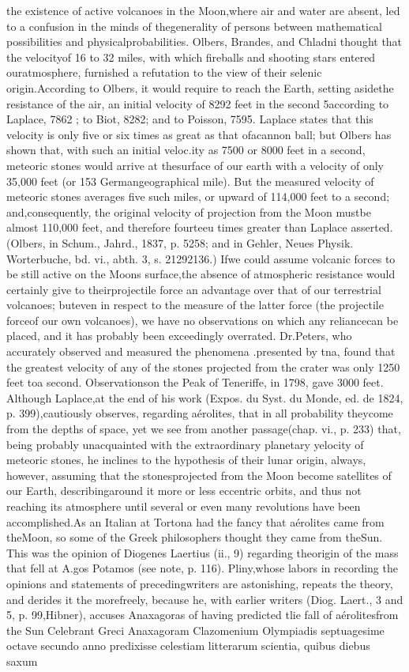 the existence of active volcanoes in the Moon,where air and water are absent, led to a confusion in the minds of thegenerality of persons between mathematical possibilities and physicalprobabilities. Olbers, Brandes, and Chladni thought  that the velocityof 16 to 32 miles, with which fireballs and shooting stars entered ouratmosphere, furnished a refutation to the view of their selenic origin.According to Olbers, it would require to reach the Earth, setting asidethe resistance of the air, an initial velocity of 8292 feet in the second 5according to Laplace, 7862 ; to Biot, 8282; and to Poisson, 7595. Laplace states that this velocity is only five or six times as great as that ofacannon ball; but Olbers has shown  that, with such an initial veloc.ity as 7500 or 8000 feet in a second, meteoric stones would arrive at thesurface of our earth with a velocity of only 35,000 feet (or 153 Germangeographical mile). But the measured velocity of meteoric stones averages five such miles, or upward of 114,000 feet to a second; and,consequently, the original velocity of projection from the Moon mustbe almost 110,000 feet, and therefore fourteeu times greater than Laplace asserted. (Olbers, in Schum., Jahrd., 1837, p. 5258; and in Gehler, Neues Physik. Worterbuche, bd. vi., abth. 3, s. 21292136.) Ifwe could assume volcanic forces to be still active on the Moons surface,the absence of atmospheric resistance would certainly give to theirprojectile force an advantage over that of our terrestrial volcanoes; buteven in respect to the measure of the latter force (the projectile forceof our own volcanoes), we have no observations on which any reliancecan be placed, and it has probably been exceedingly overrated. Dr.Peters, who accurately observed and measured the phenomena .presented by tna, found that the greatest velocity of any of the stones projected from the crater was only 1250 feet toa second. Observationson the Peak of Teneriffe, in 1798, gave 3000 feet. Although Laplace,at the end of his work (Expos. du Syst. du Monde, ed. de 1824, p. 399),cautiously observes, regarding a\'{e}rolites, that in all probability theycome from the depths of space, yet we see from another passage(chap. vi., p. 233) that, being probably unacquainted with the extraordinary planetary yelocity of meteoric stones, he inclines to the hypothesis of their lunar origin, always, however, assuming that the stonesprojected from the Moon become satellites of our Earth, describingaround it more or less eccentric orbits, and thus not reaching its atmosphere until several or even many revolutions have been accomplished.As an Italian at Tortona had the fancy that a\'{e}rolites came from theMoon, so some of the Greek philosophers thought they came from theSun. This was the opinion of Diogenes Laertius (ii., 9) regarding theorigin of the mass that fell at A.gos Potamos (see note, p. 116). Pliny,whose labors in recording the opinions and statements of precedingwriters are astonishing, repeats the theory, and derides it the morefreely, because he, with earlier writers (Diog. Laert., 3 and 5, p. 99,Hibner), accuses Anaxagoras of having predicted tlie fall of a\'{e}rolitesfrom the Sun Celebrant Greci Anaxagoram Clazomenium Olympiadis septuagesime octave secundo anno predixisse celestiam litterarum scientia, quibus diebus saxum 